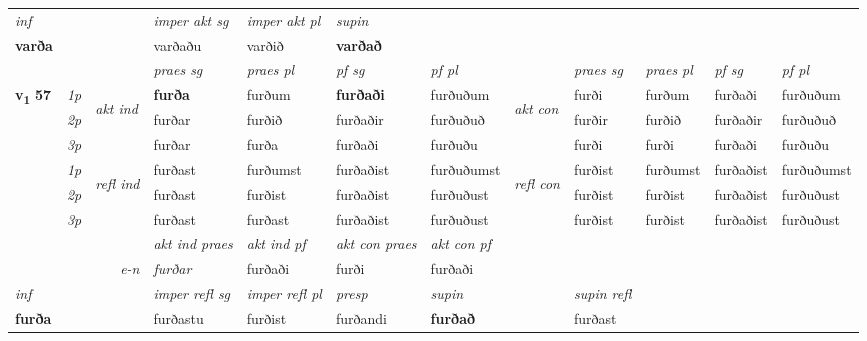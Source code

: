 \begin{longtable}[l]{X>{\footnotesize\itshape}llXXXXlXXXX}
   {\textit{inf}} & &  & \textit{imper akt sg} & \textit{imper akt pl}    & \textit{supin}   \\*
  {\textbf{varða}} & && varðaðu  & varðið    &  \textbf{varðað}   \\*

\midrule

 & &   & \textit{praes sg}  & \textit{praes pl}    & \textit{ pf sg} & \textit{pf pl} & & \textit{praes sg}  & \textit{praes pl}    & \textit{pf sg} & \textit{pf pl }  \\ \cmidrule{4-7} \cmidrule{9-12}
 \multirow{2}{*}{{{\textbf{v{\textsubscript{1}}} \Large{\textbf{57}}}}}  & 1p & \multirow{3}{*}{\begin{turn}{90}\textit{akt ind}\end{turn}} & \textbf{furða} & furðum & \textbf{furðaði} & furðuðum & \multirow{3}{*}{\begin{turn}{90}\textit{akt con}\end{turn}} &furði & furðum & furðaði & furðuðum\\*
 & 2p &  &  furðar  & furðið & furðaðir & furðuðuð & & furðir & furðið & furðaðir & furðuðuð \\*
 & 3p &  & furðar & furða & furðaði & furðuðu & & furði & furði& furðaði & furðuðu \\*
\cmidrule{4-7} \cmidrule{9-12}
 & 1p & \multirow{3}{*}{\begin{turn}{90}\textit{refl ind}\end{turn}}  & furðast & furðumst & furðaðist & furðuðumst & \multirow{3}{*}{\begin{turn}{90}\textit{refl con}\end{turn}}  &furðist & furðumst & furðaðist & furðuðumst \\*
 & 2p &  & furðast & furðist & furðaðist & furðuðust & &furðist & furðist & furðaðist & furðuðust \\*
 & 3p  & & furðast & furðast & furðaðist & furðuðust & & furðist & furðist& furðaðist & furðuðust \\*
\cmidrule{4-7} \cmidrule{9-12}

   && &  \textit{akt ind praes} & \textit{akt ind pf} & \textit{akt con praes} & \textit{akt con pf} \\*
\multicolumn{3}{r}{\textit{e-n}} & furðar & furðaði & furði & furðaði \\*

\cmidrule{4-7}
   {\textit{inf}} & &   & \textit{imper refl sg} & \textit{imper refl pl} & \textit{presp} & \textit{supin} && \textit{supin refl}  \\*
  {\textbf{furða}} & &   & furðastu & furðist & furðandi &  \textbf{furðað} && furðast  \\*


\end{longtable}
